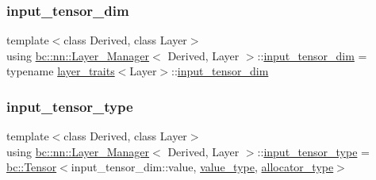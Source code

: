 \subsubsection{\texorpdfstring{input\+\_\+tensor\+\_\+dim}{input\_tensor\_dim}}
{\footnotesize\ttfamily template$<$class Derived, class Layer$>$ \\
using \hyperlink{structbc_1_1nn_1_1Layer__Manager}{bc\+::nn\+::\+Layer\+\_\+\+Manager}$<$ Derived, Layer $>$\+::\hyperlink{structbc_1_1nn_1_1Layer__Manager_a2f124b1c1df68e184adf91d16cf0a5c3}{input\+\_\+tensor\+\_\+dim} =  typename \hyperlink{structbc_1_1nn_1_1layer__traits}{layer\+\_\+traits}$<$Layer$>$\+::\hyperlink{structbc_1_1nn_1_1Layer__Manager_a2f124b1c1df68e184adf91d16cf0a5c3}{input\+\_\+tensor\+\_\+dim}}

\mbox{\label{structbc_1_1nn_1_1Layer__Manager_aad655a7315acde4c1ff5530b8d4331d3}} 
\subsubsection{\texorpdfstring{input\+\_\+tensor\+\_\+type}{input\_tensor\_type}}
{\footnotesize\ttfamily template$<$class Derived, class Layer$>$ \\
using \hyperlink{structbc_1_1nn_1_1Layer__Manager}{bc\+::nn\+::\+Layer\+\_\+\+Manager}$<$ Derived, Layer $>$\+::\hyperlink{structbc_1_1nn_1_1Layer__Manager_aad655a7315acde4c1ff5530b8d4331d3}{input\+\_\+tensor\+\_\+type} =  \hyperlink{namespacebc_a659391e47ab612be3ba6c18cf9c89159}{bc\+::\+Tensor}$<$input\+\_\+tensor\+\_\+dim\+::value, \hyperlink{structbc_1_1nn_1_1Layer__Manager_af6edd9edf47c73bfc1b200b3cbf2155f}{value\+\_\+type}, \hyperlink{structbc_1_1nn_1_1Layer__Manager_a6618b1c4afdad0eafd781b319f27f230}{allocator\+\_\+type}$>$}

\mbox{\label{structbc_1_1nn_1_1Layer__Manager_a7b70f92269eee6d1110acf65cc988b67}} 
